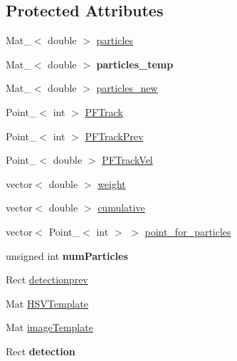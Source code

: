 \subsection*{Protected Attributes}
\begin{DoxyCompactItemize}
\item 
Mat\-\_\-$<$ double $>$ \hyperlink{classParticleFilter_ae9823740efabda90ff9c24b7b8f91dc5}{particles}
\item 
\hypertarget{classParticleFilter_a49bb3d6701d3b0ca2a51f36620370310}{Mat\-\_\-$<$ double $>$ {\bfseries particles\-\_\-temp}}\label{classParticleFilter_a49bb3d6701d3b0ca2a51f36620370310}

\item 
Mat\-\_\-$<$ double $>$ \hyperlink{classParticleFilter_ab006458e205d5d2f6e6f554ee5abfe81}{particles\-\_\-new}
\item 
Point\-\_\-$<$ int $>$ \hyperlink{classParticleFilter_aa86c3e9fab84151e57b81035e664fefc}{P\-F\-Track}
\item 
Point\-\_\-$<$ int $>$ \hyperlink{classParticleFilter_a1f55e5d172c164c03fb3174fb321a251}{P\-F\-Track\-Prev}
\item 
Point\-\_\-$<$ double $>$ \hyperlink{classParticleFilter_a1209f1d4f8a33ea69e60cb8c021b96c2}{P\-F\-Track\-Vel}
\item 
vector$<$ double $>$ \hyperlink{classParticleFilter_a1363d05f9deb026bd5e07a1406a994e5}{weight}
\item 
vector$<$ double $>$ \hyperlink{classParticleFilter_a608013ea3cc68c34c465611444a6e25d}{cumulative}
\item 
vector$<$ Point\-\_\-$<$ int $>$ $>$ \hyperlink{classParticleFilter_a92daeb1540baafc2b3bf6fec5b607120}{point\-\_\-for\-\_\-particles}
\item 
\hypertarget{classParticleFilter_aa5f589aec6e31109661020619253170a}{unsigned int {\bfseries num\-Particles}}\label{classParticleFilter_aa5f589aec6e31109661020619253170a}

\item 
Rect \hyperlink{classParticleFilter_a594c1a59fdf0251267c64828850a085f}{detectionprev}
\item 
Mat \hyperlink{classParticleFilter_a4bf1b980e79eb4677a6274cbc70be0fa}{H\-S\-V\-Template}
\item 
Mat \hyperlink{classParticleFilter_a5cd6a05af7e09715cc7728abac18d38e}{image\-Template}
\item 
\hypertarget{classParticleFilter_a1cc6b17c786ba9072fd9ffbaa8d2e414}{Rect {\bfseries detection}}\label{classParticleFilter_a1cc6b17c786ba9072fd9ffbaa8d2e414}


\end{DoxyCompactItemize}
